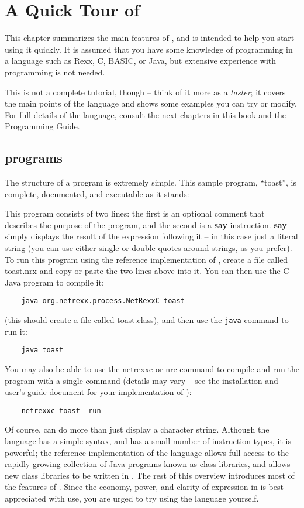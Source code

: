 \chapter{A Quick Tour of \nr{}}
This chapter summarizes the main features of \nr{}, and is intended
to help you start using it quickly. It is assumed that you have some
knowledge of programming in a language such as Rexx, C, BASIC, or
Java, but extensive experience with programming is not needed.

This is not a complete tutorial, though – think of it more as a
\emph{taster}; it covers the main points of the language and shows some
examples you can try or modify. For full details of the language,
consult the next chapters in this book and the \nr{} Programming Guide.

\section{\nr{} programs}
The structure of a \nr{} program is extremely simple. This sample
program, “toast”, is complete, documented, and executable as it
stands:

This program consists of two lines: the first is an optional comment that describes the purpose of the program, and the second is a \textbf{say} instruction. \textbf{say} simply displays the result of the expression following it – in this case just a literal string (you can use either single or double quotes around strings, as you prefer).
To run this program using the reference implementation of \nr{},
create a file called toast.nrx and copy or paste the two lines above
into it. You can then use the \nr{}C Java program to compile it:
\begin{lstlisting}
    java org.netrexx.process.NetRexxC toast
\end{lstlisting}
(this should create a file called toast.class), and then use
the \texttt{java} command to run it:
\begin{lstlisting}
    java toast
\end{lstlisting}
You may also be able to use the netrexxc or nrc command to compile and
run the program with a single command (details may vary – see the
installation and user’s guide document for your implementation of
\nr{}):
\begin{lstlisting}
    netrexxc toast -run
\end{lstlisting}
Of course, \nr{} can do more than just display a character string. Although the language has a simple syntax, and has a small number of instruction types, it is powerful; the reference implementation of the language allows full access to the rapidly growing collection of Java programs known as class libraries, and allows new class libraries to be written in \nr{}.
The rest of this overview introduces most of the features of \nr{}. Since the economy, power, and clarity of expression in \nr{} is best appreciated with use, you are urged to try using the language yourself.
